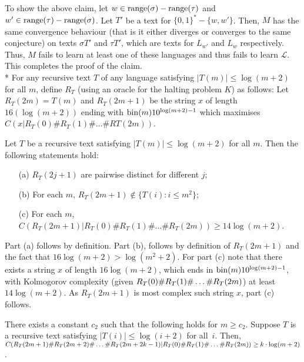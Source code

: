\documentclass{LMCS}
\newcommand{\CalL}{{\mathcal L}}
\newcommand{\range}{{\rm range}}
\newcommand{\bin}{{\rm bin}}
\theoremstyle{plain}\newtheorem{athm}[thm]{Theorem}
\theoremstyle{plain}\newtheorem{aprop}[thm]{Proposition}
\theoremstyle{plain}\newtheorem{aprob}[thm]{Open Problem}
\theoremstyle{plain}\newtheorem{acor}[thm]{Corollary}
\theoremstyle{plain}\newtheorem{alem}[thm]{Lemma}
\theoremstyle{definition}\newtheorem{adefn}[thm]{Definition}
\theoremstyle{definition}\newtheorem{arem}[thm]{Remark}
\theoremstyle{plain}\newtheorem{aexmp}[thm]{Example}
\theoremstyle{plain}\newtheorem{aclm}[thm]{Claim}
\def\sp{\\*\indent}
\begin{document}
\noindent
To show the above claim, let $w \in \range(\sigma)-\range(\tau)$
and $w' \in \range(\tau)-\range(\sigma)$.
Let $T'$ be a text for $\{0,1\}^*-\{w,w'\}$. Then,
$M$ has the same convergence behaviour (that is it either diverges or converges
to the same conjecture) on texts $\sigma T'$ and $\tau T'$, which are
texts for $L_{w'}$ and $L_w$ respectively. Thus, $M$ fails to learn at least
one of these languages and thus fails to learn $\CalL$.
This completes the proof of the claim.
\sp
For any recursive text $T$ of any language
satisfying $|T(m)| \leq \log(m+2)$ for all $m$,
define $R_T$ (using an oracle for the halting problem $K$) as follows:
Let $R_T(2m)=T(m)$
and $R_T(2m+1)$ be the string $x$ of length $16(\log(m+2))$ ending
with $\bin(m) 1 0^{\log(m+2)-1}$ which maximises $C(x |
R_T(0)\#R_T(1)\#\ldots\#RT(2m))$.


\begin{clm}\label{clm-last2}
Let $T$ be a recursive text satisfying $|T(m)| \leq \log(m+2)$ for all $m$.
Then the following statements hold:
\begin{enumerate}[(a)]
\item[(a)] $R_T(2j+1)$ are pairwise distinct for different $j$;
\item[(b)] For each $m$, $R_T(2m+1) \notin \{T(i): i \leq m^2\}$;
\item[(c)] For each $m$, $C(R_T(2m+1) | 
       R_T(0)\#R_T(1)\#\ldots\#R_T(2m)) \geq 14\log(m+2)$.
\end{enumerate}
\end{clm}

\noindent
Part (a) follows by definition. Part (b), follows by definition
of $R_T(2m+1)$ and the fact that $16\log(m+2) > \log(m^2+2)$.
For part (c) note that
there exists a string $x$ of length $16 \log(m+2)$, which
ends in $\bin(m)10^{\log(m+2)-1}$, with Kolmogorov complexity
(given $R_T(0)\#\linebreak[3]
R_T(1)\#\linebreak[3] \ldots\linebreak[3] \#R_T(2m)$)
at least $14 \log(m+2)$. As $R_T(2m+1)$ is most complex such string
$x$, part (c) follows.

\begin{clm}\label{clm-last3}
There exists a constant $c_2$ such that the following holds for $m \geq c_2$.
Suppose $T$ is a recursive text satisfying $|T(i)| \leq \log(i+2)$ for all~$i$.
Then,
$C(R_T(2m+1)\#R_T(2m+2)\linebreak[3]
\#\ldots\#R_T(2m+2k-1)| \linebreak[3] 
R_T(0)\#\linebreak[3] R_T(1)\#\linebreak[3] \ldots
\linebreak[3]\#R_T(2m)) \geq k \cdot \log(m+2)$.
\end{clm}
\end{document}
